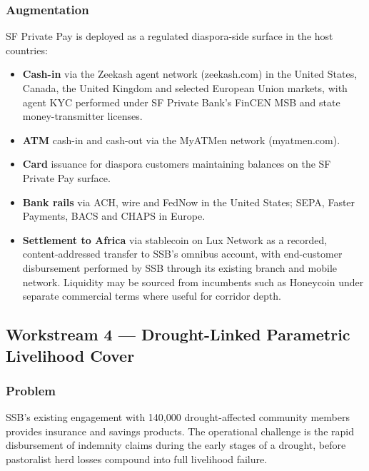 \documentclass[11pt,letterpaper]{article}
\begin{document}
\subsubsection{Augmentation}
SF Private Pay is deployed as a regulated diaspora-side surface in the
host countries:
\begin{itemize}[leftmargin=1.6em]
  \item \textbf{Cash-in} via the Zeekash agent network
        (zeekash.com) in the United States, Canada, the United Kingdom
        and selected European Union markets, with agent KYC performed
        under SF Private Bank's FinCEN MSB and state money-transmitter
        licenses.
  \item \textbf{ATM} cash-in and cash-out via the MyATMen network
        (myatmen.com).
  \item \textbf{Card} issuance for diaspora customers maintaining
        balances on the SF Private Pay surface.
  \item \textbf{Bank rails} via ACH, wire and FedNow in the United
        States; SEPA, Faster Payments, BACS and CHAPS in Europe.
  \item \textbf{Settlement to Africa} via stablecoin on Lux Network as
        a recorded, content-addressed transfer to SSB's omnibus
        account, with end-customer disbursement performed by SSB
        through its existing branch and mobile network. Liquidity may
        be sourced from incumbents such as Honeycoin under separate
        commercial terms where useful for corridor depth.
\end{itemize}

\subsection{Workstream 4 --- Drought-Linked Parametric Livelihood Cover}

\subsubsection{Problem}
SSB's existing engagement with 140{,}000 drought-affected community
members \cite{garowe_ssb} provides insurance and savings products. The
operational challenge is the rapid disbursement of indemnity claims
during the early stages of a drought, before pastoralist herd losses
compound into full livelihood failure.
\end{document}
